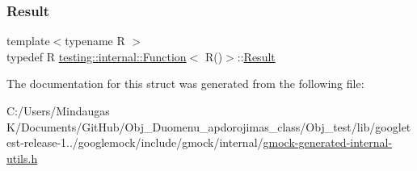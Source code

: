 \mbox{\label{structtesting_1_1internal_1_1_function_3_01_r_07_08_4_a5c228a886ef598ac10988f8de5e32ca1}} 
\subsubsection{\texorpdfstring{Result}{Result}}
{\footnotesize\ttfamily template$<$typename R $>$ \\
typedef R \mbox{\hyperlink{structtesting_1_1internal_1_1_function}{testing\+::internal\+::\+Function}}$<$ R()$>$\+::\mbox{\hyperlink{structtesting_1_1internal_1_1_function_3_01_r_07_08_4_a5c228a886ef598ac10988f8de5e32ca1}{Result}}}



The documentation for this struct was generated from the following file\+:\begin{DoxyCompactItemize}
\item 
C\+:/\+Users/\+Mindaugas K/\+Documents/\+Git\+Hub/\+Obj\+\_\+\+Duomenu\+\_\+apdorojimas\+\_\+class/\+Obj\+\_\+test/lib/googletest-\/release-\/1../googlemock/include/gmock/internal/\mbox{\hyperlink{gmock-generated-internal-utils_8h}{gmock-\/generated-\/internal-\/utils.\+h}}\end{DoxyCompactItemize}
